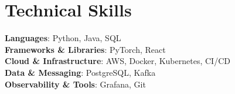 \documentclass[letterpaper,11pt]{article}
\begin{document}
\section{Technical Skills}
 \begin{itemize}[leftmargin=0.15in, label={}]
    \small{\item{
     \textbf{Languages}{: Python, Java, SQL} \\
     \textbf{Frameworks \& Libraries}{: PyTorch, React} \\
     \textbf{Cloud \& Infrastructure}{: AWS, Docker, Kubernetes, CI/CD} \\
     \textbf{Data \& Messaging}{: PostgreSQL, Kafka} \\
     \textbf{Observability \& Tools}{: Grafana, Git}
    }}
 \end{itemize}


\end{document}
